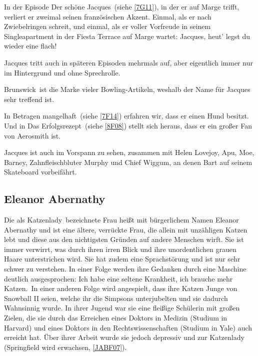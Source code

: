 {In der Episode \glqq Der schöne Jacques\grqq\ (siehe \ref{7G11}), in der er auf Marge trifft, verliert er zweimal seinen französischen Akzent. Einmal, als er nach Zwiebelringen schreit, und einmal, als er voller Vorfreude in seinem Singleapartment in der Fiesta Terrace auf Marge wartet: \glqq Jacques, heut' legst du wieder eine flach!\grqq 

Jacques tritt auch in späteren Episoden mehrmals auf, aber eigentlich immer nur im Hintergrund und ohne Sprechrolle.

\glqq Brunswick\grqq\ ist die Marke vieler Bowling-Artikeln, weshalb der Name für Jacques sehr treffend ist.

In \glqq Betragen mangelhaft\grqq\ (siehe \ref{7F14}) erfahren wir, dass er einen Hund besitzt. Und in \glqq Das Erfolgsrezept\grqq\ (siehe \ref{8F08}) stellt sich heraus, dass er ein großer Fan von Aerosmith ist.

Jacques ist auch im Vorspann zu sehen, zusammen mit Helen Lovejoy, Apu, Moe, Barney, Zahnfleischbluter Murphy und Chief Wiggum, an denen Bart auf seinem Skateboard vorbeifährt.


\subsection{Eleanor Abernathy}\label{EleanorAbernathy} 
Die als \glqq Katzenlady\grqq\ bezeichnete Frau heißt mit bürgerlichem Namen Eleanor Abernathy und ist eine ältere, verrückte Frau, die allein mit unzähligen Katzen lebt und diese aus den nichtigsten Gründen auf andere Menschen wirft. Sie ist immer verwirrt, was durch ihren irren Blick und ihre unordentlichen grauen Haare unterstrichen wird. Sie hat zudem eine Sprachstörung und ist nur sehr schwer zu verstehen. In einer Folge werden ihre Gedanken durch eine Maschine deutlich ausgesprochen: \glqq Ich habe eine seltene Krankheit, ich brauche mehr Katzen.\grqq\ In einer anderen Folge wird angespielt, dass ihre Katzen Junge von Snowball II seien, welche ihr die Simpsons unterjubelten und sie dadurch Wahnsinnig wurde. In ihrer Jugend war sie eine fleißige Schülerin mit großen Zielen, die sie durch das Erreichen eines Doktors in Medizin (Studium in Harvard) und eines Doktors in den Rechtswissenschaften (Studium in Yale) auch erreicht hat. Über ihrer Arbeit wurde sie jedoch depressiv und zur Katzenlady (\glqq Springfield wird erwachsen\grqq , \ref{JABF07}).

}
